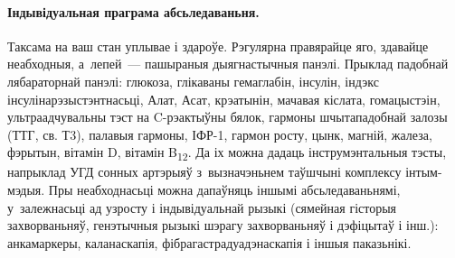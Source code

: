 \paragraph{Індывідуальная праграма абсьледаваньня.}
Таксама на ваш стан уплывае і здароўе. Рэгулярна правярайце яго, здавайце неабходныя, а~лепей~--- пашыраныя дыягнастычныя панэлі. Прыклад падобнай лябараторнай панэлі: глюкоза, глікаваны гемаглабін, інсулін, індэкс інсулінарэзыстэнтнасьці, Алат, Асат, крэатынін, мачавая кіслата, гомацыстэін, ультраадчувальны тэст на C-рэактыўны бялок, гармоны шчытападобнай залозы (ТТГ, св. Т3), палавыя гармоны, ІФР-1, гармон росту, цынк, магній, жалеза, фэрытын, вітамін D, вітамін B\textsubscript{12}. Да іх можна дадаць інструмэнтальныя тэсты, напрыклад УГД сонных артэрыяў з~вызначэньнем таўшчыні комплексу інтым-мэдыя. Пры неабходнасьці можна дапаўняць іншымі абсьледаваньнямі, у~залежнасьці ад узросту і індывідуальнай рызыкі (сямейная гісторыя захворваньняў, генэтычныя рызыкі шэрагу захворваньняў і дэфіцытаў і інш.): анкамаркеры, каланаскапія, фібрагастрадуадэнаскапія і іншыя паказьнікі.
